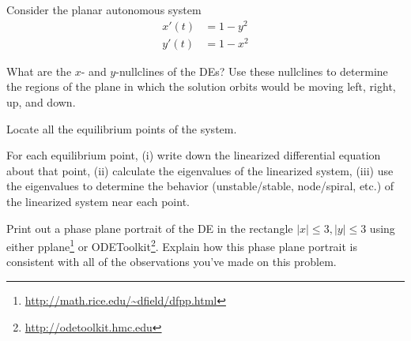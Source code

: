 \documentclass[boxes]{gsypset}
\begin{document}
	\begin{problem}
		Consider the planar autonomous system 
		\begin{align*}
			x'(t) &= 1-y^2\\
			y'(t) &= 1-x^2
		\end{align*}
		
		\begin{subproblems}
			\subproblem 
				What are the $x$- and $y$-nullclines of the DEs? 
				Use these nullclines to determine the regions of the plane in which 
				the solution orbits would be moving left, right, up, and down.
				\begin{solution}
					
				\end{solution}
			\subproblem Locate all the equilibrium points of the system.
				\begin{solution}
					
				\end{solution}
			\subproblem 
				For each equilibrium point, 
				(i) write down the linearized differential equation about that point, 
				(ii) calculate the eigenvalues of the linearized system, 
				(iii) use the eigenvalues to determine the behavior (unstable/stable, node/spiral, etc.) 
				of the linearized system near each point.
				\begin{solution}
					
				\end{solution}
			\subproblem 
				Print out a phase plane portrait of the DE in the rectangle $|x|\leq 3, |y| \leq 3$ 
				using either pplane\footnote{\url{http://math.rice.edu/~dfield/dfpp.html}} or
				ODEToolkit\footnote{\url{http://odetoolkit.hmc.edu}}. 
				Explain how this phase plane portrait is consistent with all of the 
				observations you've made on this problem.
				\begin{solution}
					
				\end{solution}
		\end{subproblems}
	\end{problem}
	
\end{document}
